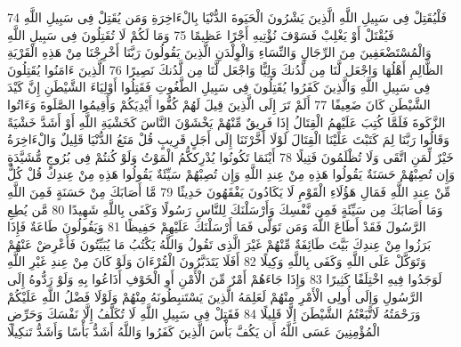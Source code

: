 {\tiny\colorbox{cl_aya}{74}} فَلْيُقَتِلْ فِى سَبِيلِ اللَّهِ الَّذِينَ يَشْرُونَ الْحَيَوةَ الدُّنْيَا بِالْءَاخِرَةِ وَمَن يُقَتِلْ فِى سَبِيلِ اللَّهِ فَيُقْتَلْ أَوْ يَغْلِبْ فَسَوْفَ نُؤْتِيهِ أَجْرًا عَظِيمًا
{\tiny\colorbox{cl_aya}{75}} وَمَا لَكُمْ لَا تُقَتِلُونَ فِى سَبِيلِ اللَّهِ وَالْمُسْتَضْعَفِينَ مِنَ الرِّجَالِ وَالنِّسَاءِ وَالْوِلْدَنِ الَّذِينَ يَقُولُونَ رَبَّنَا أَخْرِجْنَا مِنْ هَذِهِ الْقَرْيَةِ الظَّالِمِ أَهْلُهَا وَاجْعَل لَّنَا مِن لَّدُنكَ وَلِيًّا وَاجْعَل لَّنَا مِن لَّدُنكَ نَصِيرًا
{\tiny\colorbox{cl_aya}{76}} الَّذِينَ ءَامَنُوا يُقَتِلُونَ فِى سَبِيلِ اللَّهِ وَالَّذِينَ كَفَرُوا يُقَتِلُونَ فِى سَبِيلِ الطَّغُوتِ فَقَتِلُوا أَوْلِيَاءَ الشَّيْطَنِ إِنَّ كَيْدَ الشَّيْطَنِ كَانَ ضَعِيفًا
{\tiny\colorbox{cl_aya}{77}} أَلَمْ تَرَ إِلَى الَّذِينَ قِيلَ لَهُمْ كُفُّوا أَيْدِيَكُمْ وَأَقِيمُوا الصَّلَوةَ وَءَاتُوا الزَّكَوةَ فَلَمَّا كُتِبَ عَلَيْهِمُ الْقِتَالُ إِذَا فَرِيقٌ مِّنْهُمْ يَخْشَوْنَ النَّاسَ كَخَشْيَةِ اللَّهِ أَوْ أَشَدَّ خَشْيَةً وَقَالُوا رَبَّنَا لِمَ كَتَبْتَ عَلَيْنَا الْقِتَالَ لَوْلَا أَخَّرْتَنَا إِلَى أَجَلٍ قَرِيبٍ قُلْ مَتَعُ الدُّنْيَا قَلِيلٌ وَالْءَاخِرَةُ خَيْرٌ لِّمَنِ اتَّقَى وَلَا تُظْلَمُونَ فَتِيلًا
{\tiny\colorbox{cl_aya}{78}} أَيْنَمَا تَكُونُوا يُدْرِككُّمُ الْمَوْتُ وَلَوْ كُنتُمْ فِى بُرُوجٍ مُّشَيَّدَةٍ وَإِن تُصِبْهُمْ حَسَنَةٌ يَقُولُوا هَذِهِ مِنْ عِندِ اللَّهِ وَإِن تُصِبْهُمْ سَيِّئَةٌ يَقُولُوا هَذِهِ مِنْ عِندِكَ قُلْ كُلٌّ مِّنْ عِندِ اللَّهِ فَمَالِ هَؤُلَاءِ الْقَوْمِ لَا يَكَادُونَ يَفْقَهُونَ حَدِيثًا
{\tiny\colorbox{cl_aya}{79}} مَّا أَصَابَكَ مِنْ حَسَنَةٍ فَمِنَ اللَّهِ وَمَا أَصَابَكَ مِن سَيِّئَةٍ فَمِن نَّفْسِكَ وَأَرْسَلْنَكَ لِلنَّاسِ رَسُولًا وَكَفَى بِاللَّهِ شَهِيدًا
{\tiny\colorbox{cl_aya}{80}} مَّن يُطِعِ الرَّسُولَ فَقَدْ أَطَاعَ اللَّهَ وَمَن تَوَلَّى فَمَا أَرْسَلْنَكَ عَلَيْهِمْ حَفِيظًا
{\tiny\colorbox{cl_aya}{81}} وَيَقُولُونَ طَاعَةٌ فَإِذَا بَرَزُوا مِنْ عِندِكَ بَيَّتَ طَائِفَةٌ مِّنْهُمْ غَيْرَ الَّذِى تَقُولُ وَاللَّهُ يَكْتُبُ مَا يُبَيِّتُونَ فَأَعْرِضْ عَنْهُمْ وَتَوَكَّلْ عَلَى اللَّهِ وَكَفَى بِاللَّهِ وَكِيلًا
{\tiny\colorbox{cl_aya}{82}} أَفَلَا يَتَدَبَّرُونَ الْقُرْءَانَ وَلَوْ كَانَ مِنْ عِندِ غَيْرِ اللَّهِ لَوَجَدُوا فِيهِ اخْتِلَفًا كَثِيرًا
{\tiny\colorbox{cl_aya}{83}} وَإِذَا جَاءَهُمْ أَمْرٌ مِّنَ الْأَمْنِ أَوِ الْخَوْفِ أَذَاعُوا بِهِ وَلَوْ رَدُّوهُ إِلَى الرَّسُولِ وَإِلَى أُولِى الْأَمْرِ مِنْهُمْ لَعَلِمَهُ الَّذِينَ يَسْتَنبِطُونَهُ مِنْهُمْ وَلَوْلَا فَضْلُ اللَّهِ عَلَيْكُمْ وَرَحْمَتُهُ لَاتَّبَعْتُمُ الشَّيْطَنَ إِلَّا قَلِيلًا
{\tiny\colorbox{cl_aya}{84}} فَقَتِلْ فِى سَبِيلِ اللَّهِ لَا تُكَلَّفُ إِلَّا نَفْسَكَ وَحَرِّضِ الْمُؤْمِنِينَ عَسَى اللَّهُ أَن يَكُفَّ بَأْسَ الَّذِينَ كَفَرُوا وَاللَّهُ أَشَدُّ بَأْسًا وَأَشَدُّ تَنكِيلًا
